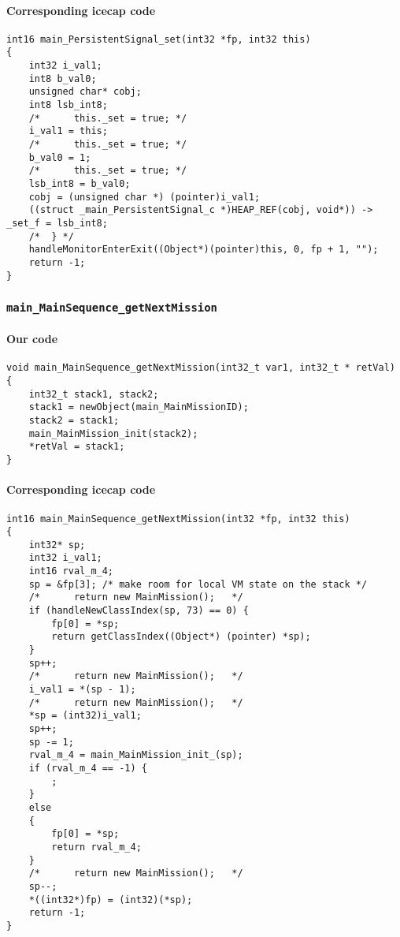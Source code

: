 \begin{landscape}
\begin{multicols}{2}
\paragraph{Corresponding icecap code}\hfill
\begin{lstlisting}[firstnumber=54666]
int16 main_PersistentSignal_set(int32 *fp, int32 this)
{
	int32 i_val1;
	int8 b_val0;
	unsigned char* cobj;
	int8 lsb_int8;
	/*		this._set = true; */
	i_val1 = this;
	/*		this._set = true; */
	b_val0 = 1;
	/*		this._set = true; */
	lsb_int8 = b_val0;
	cobj = (unsigned char *) (pointer)i_val1;
	((struct _main_PersistentSignal_c *)HEAP_REF(cobj, void*)) -> _set_f = lsb_int8;
	/*	} */
	handleMonitorEnterExit((Object*)(pointer)this, 0, fp + 1, "");
	return -1;
}
\end{lstlisting}

\subsubsection{\texttt{main\_MainSequence\_getNextMission}}

\paragraph{Our code}\hfill
\begin{lstlisting}[firstnumber=1869]
void main_MainSequence_getNextMission(int32_t var1, int32_t * retVal) {
	int32_t stack1, stack2;
	stack1 = newObject(main_MainMissionID);
	stack2 = stack1;
	main_MainMission_init(stack2);
	*retVal = stack1;
}
\end{lstlisting}

\paragraph{Corresponding icecap code}\hfill
\begin{lstlisting}[firstnumber=54381]
int16 main_MainSequence_getNextMission(int32 *fp, int32 this)
{
	int32* sp;
	int32 i_val1;
	int16 rval_m_4;
	sp = &fp[3]; /* make room for local VM state on the stack */
	/*		return new MainMission();   */
	if (handleNewClassIndex(sp, 73) == 0) {
		fp[0] = *sp;
		return getClassIndex((Object*) (pointer) *sp);
	}
	sp++;
	/*		return new MainMission();   */
	i_val1 = *(sp - 1);
	/*		return new MainMission();   */
	*sp = (int32)i_val1;
	sp++;
	sp -= 1;
	rval_m_4 = main_MainMission_init_(sp);
	if (rval_m_4 == -1) {
		;
	}
	else
	{
		fp[0] = *sp;
		return rval_m_4;
	}
	/*		return new MainMission();   */
	sp--;
	*((int32*)fp) = (int32)(*sp);
	return -1;
}
\end{lstlisting}


\end{multicols}
\end{landscape}

